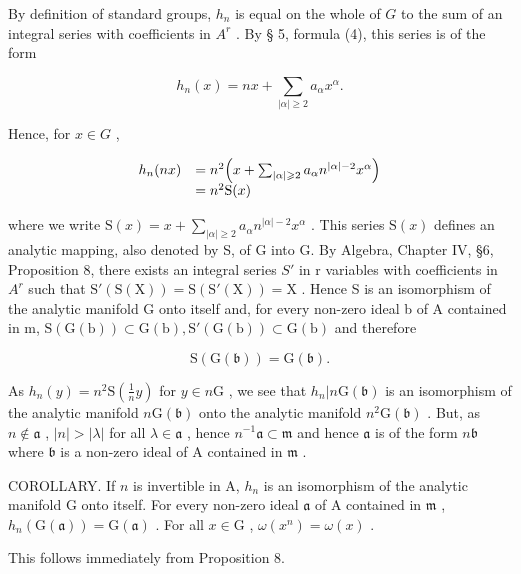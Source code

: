 By definition of standard groups, \(h_n\) is equal on the whole of \(G\) to the sum of an integral series with coefficients in \(A^r\) . By § 5, formula (4), this series is of the form

\[
h _ {n} (x) = n x + \sum_ {| \alpha | \geqslant 2} a _ {\alpha} x ^ {\alpha}.
\]

Hence, for \(x \in G\) ,

\[
\begin{array}{r l} h _ {n} (n x) & = n ^ {2} \Big (x + \sum_ {| \alpha | \geqslant 2} a _ {\alpha} n ^ {| \alpha | - 2} x ^ {\alpha} \Big) \\ & = n ^ {2} \mathrm{S} (x) \end{array}
\]

where we write \(\mathrm{S}(x)=x+\sum_{|\alpha| \geq 2} a_{\alpha} n^{|\alpha|-2} x^{\alpha}\) . This series \(\mathrm{S}(x)\) defines an analytic mapping, also denoted by S, of G into G. By Algebra, Chapter IV, §6, Proposition 8, there exists an integral series \(S'\) in r variables with coefficients in \(A^r\) such that \(\mathrm{S}'(\mathrm{S}(\mathrm{X}))=\mathrm{S}(\mathrm{S}'(\mathrm{X}))=\mathrm{X}\) . Hence S is an isomorphism of the analytic manifold G onto itself and, for every non-zero ideal b of A contained in m, \(\mathrm{S}(\mathrm{G}(\mathrm{b}))\subset\mathrm{G}(\mathrm{b}),\mathrm{S}'(\mathrm{G}(\mathrm{b}))\subset\mathrm{G}(\mathrm{b})\) and therefore

\[
\mathrm{S} (\mathrm{G} (\mathfrak {b})) = \mathrm{G} (\mathfrak {b}).
\]

As \(h_n(y) = n^2\mathrm{S}\left(\frac{1}{n} y\right)\) for \(y \in n\mathrm{G}\) , we see that \(h_n|n\mathrm{G}(\mathfrak{b})\) is an isomorphism of the analytic manifold \(n\mathrm{G}(\mathfrak{b})\) onto the analytic manifold \(n^2\mathrm{G}(\mathfrak{b})\) . But, as \(n \notin \mathfrak{a}\) , \(|n| > |\lambda|\) for all \(\lambda \in \mathfrak{a}\) , hence \(n^{-1}\mathfrak{a} \subset \mathfrak{m}\) and hence \(\mathfrak{a}\) is of the form \(n\mathfrak{b}\) where \(\mathfrak{b}\) is a non-zero ideal of \(\mathrm{A}\) contained in \(\mathfrak{m}\) .

COROLLARY. If \(n\) is invertible in A, \(h_n\) is an isomorphism of the analytic manifold G onto itself. For every non-zero ideal \(\mathfrak{a}\) of A contained in \(\mathfrak{m}\) , \(h_n(\mathrm{G}(\mathfrak{a})) = \mathrm{G}(\mathfrak{a})\) . For all \(x \in \mathrm{G}\) , \(\omega(x^n) = \omega(x)\) .

This follows immediately from Proposition 8.

